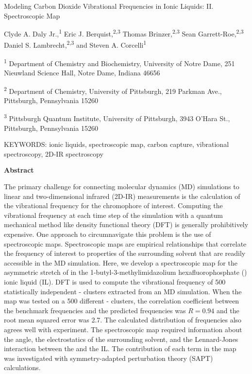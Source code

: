 Modeling Carbon Dioxide Vibrational Frequencies in Ionic Liquids: II. Spectroscopic Map

Clyde A. Daly Jr.,\textsuperscript{1} Eric J. Berquist,\textsuperscript{2,3} Thomas Brinzer,\textsuperscript{2,3} Sean Garrett-Roe,\textsuperscript{2,3} Daniel S. Lambrecht,\textsuperscript{2,3} and Steven A. Corcelli\textsuperscript{1}

\textsuperscript{1} Department of Chemistry and Biochemistry, University of Notre Dame, 251 Nieuwland Science Hall, Notre Dame, Indiana 46656

\textsuperscript{2} Department of Chemistry, University of Pittsburgh, 219 Parkman Ave., Pittsburgh, Pennsylvania 15260

\textsuperscript{3} Pittsburgh Quantum Institute, University of Pittsburgh, 3943 O'Hara St., Pittsburgh, Pennsylvania 15260

KEYWORDS: ionic liquids, spectroscopic map, carbon capture, vibrational spectroscopy, 2D-IR spectroscopy

\textbf{Abstract}

The primary challenge for connecting molecular dynamics (MD) simulations to linear and two-dimensional infrared (2D-IR) measurements is the calculation of the vibrational frequency for the chromophore of interest. Computing the vibrational frequency at each time step of the simulation with a quantum mechanical method like density functional theory (DFT) is generally prohibitively expensive. One approach to circumnavigate this problem is the use of spectroscopic maps. Spectroscopic maps are empirical relationships that correlate the frequency of interest to properties of the surrounding solvent that are readily accessible in the MD simulation. Here, we develop a spectroscopic map for the asymmetric stretch of  in the 1-butyl-3-methylimidazolium hexafluorophosphate (\ce{[C4C1im][PF6]}) ionic liquid (IL). DFT is used to compute the vibrational frequency of \num{500} statistically independent -\ce{[C4C1im][PF6]} clusters extracted from an MD simulation. When the map was tested on a \num{500} different -\ce{[C4C1im][PF6]} clusters, the correlation coefficient between the benchmark frequencies and the predicted frequencies was \(R = 0.94\) and the root mean squared error was \SI{2.7}{\wavenumber}. The calculated distribution of frequencies also agrees well with experiment. The spectroscopic map required information about the  angle, the electrostatics of the surrounding solvent, and the Lennard-Jones interaction between the  and the IL. The contribution of each term in the map was investigated with symmetry-adapted perturbation theory (SAPT) calculations.

